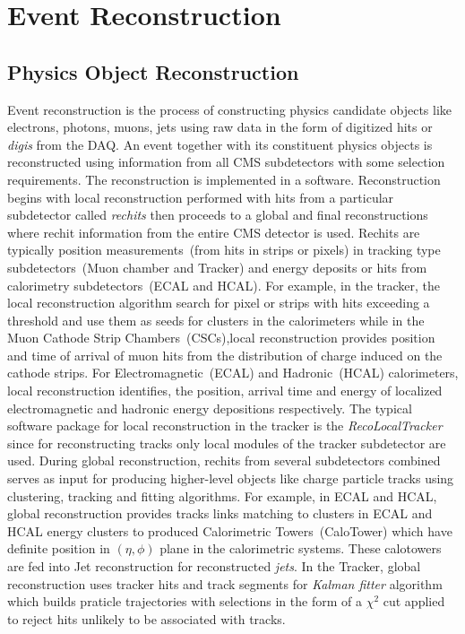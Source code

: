 \chapter{Event Reconstruction}
\label{Reconstruction_and Particle_ID_chapter}
\section{Physics Object Reconstruction}
Event reconstruction is the process of constructing physics candidate objects like electrons, photons, muons, jets using raw data in the form of digitized hits or \textit{digis} from the DAQ. An event together with its constituent physics objects is reconstructed using information from all CMS subdetectors with some selection requirements. The reconstruction is implemented in a software.
Reconstruction begins with local reconstruction performed with hits from a particular subdetector called \textit{rechits}
then proceeds to a global and final reconstructions where rechit information from the entire CMS detector is used. Rechits are typically position measurements~(from  hits in strips or pixels) in tracking type subdetectors~(Muon chamber and Tracker) and energy deposits or hits from calorimetry subdetectors~(ECAL and HCAL). For example, in the tracker, the local reconstruction algorithm search for pixel or strips with hits exceeding a threshold and use them as seeds for clusters in the calorimeters while in the Muon Cathode Strip Chambers~(CSCs),local reconstruction provides position and time of arrival of muon hits from the distribution of charge induced on the cathode strips. For Electromagnetic~(ECAL) and Hadronic~(HCAL) calorimeters, local reconstruction identifies, the position, arrival time and energy of localized electromagnetic and hadronic energy depositions respectively. The typical software package for local reconstruction in the tracker is the \textit{RecoLocalTracker} since for reconstructing tracks only local modules of the tracker subdetector are used. During global reconstruction, rechits from several subdetectors combined serves as input for producing higher-level objects like charge particle tracks using clustering, tracking and fitting algorithms.  For example, in ECAL and HCAL, global reconstruction provides tracks  links matching to clusters in ECAL and HCAL energy clusters to produced Calorimetric Towers~(CaloTower) which have definite position in $(\eta, \phi)$ plane in the calorimetric systems. These calotowers are fed into Jet reconstruction for reconstructed \textit{jets}. In the Tracker, global reconstruction uses tracker hits and track segments for \textit{Kalman fitter} algorithm which builds praticle trajectories  with selections in the form of a $\chi^{2}$ cut applied to reject hits unlikely to be associated with tracks. 
